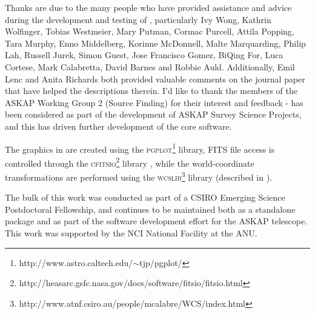 %
%
%
%

Thanks are due to the many people who have provided assistance and
advice during the development and testing of \duchamp, particularly
Ivy Wong, Kathrin Wolfinger, Tobias Westmeier, Mary Putman, Cormac
Purcell, Attila Popping, Tara Murphy, Enno Middelberg, Korinne
McDonnell, Malte Marquarding, Philip Lah, Russell Jurek, Simon Guest,
Jose Francisco Gomez, BiQing For, Luca Cortese, Mark Calabretta, David
Barnes and Robbie Auld. Additionally, Emil Lenc and Anita Richards
both provided valuable comments on the journal paper that have helped
the descriptions therein. I'd like to thank the members of the ASKAP
Working Group 2 (Source Finding) for their interest and feedback -
\duchamp has been considered as part of the development of ASKAP
Survey Science Projects, and this has driven further development of
the core \duchamp software.

The graphics in \duchamp are created using the
\textsc{pgplot}\footnote{http://www.astro.caltech.edu/$\sim$tjp/pgplot/}
library, FITS file access is controlled through the
\textsc{cfitsio}\footnote{http://heasarc.gsfc.nasa.gov/docs/software/fitsio/fitsio.html}
library \citep{pence99}, while the world-coordinate transformations
are performed using the
\textsc{wcslib}\footnote{http://www.atnf.csiro.au/people/mcalabre/WCS/index.html}
library (described in \citet{calabretta02}).

The bulk of this work was conducted as part of a CSIRO Emerging
Science Postdoctoral Fellowship, and \duchamp continues to be
maintained both as a standalone package and as part of the software
development effort for the ASKAP telescope. This work was supported by
the NCI National Facility at the ANU.



